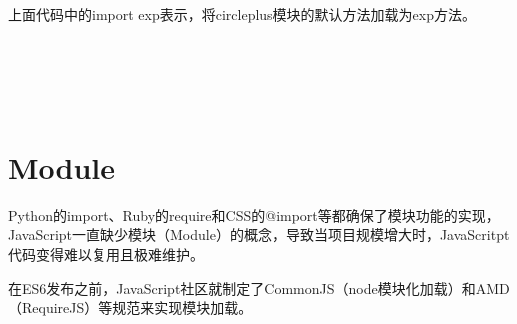 上面代码中的import exp表示，将circleplus模块的默认方法加载为exp方法。




\begin{lstlisting}[language=JavaScript]

\end{lstlisting}






\begin{lstlisting}[language=JavaScript]

\end{lstlisting}







\begin{lstlisting}[language=JavaScript]

\end{lstlisting}







\begin{lstlisting}[language=JavaScript]

\end{lstlisting}







\begin{lstlisting}[language=JavaScript]

\end{lstlisting}






\begin{lstlisting}[language=JavaScript]

\end{lstlisting}


\chapter{Module}

Python的import、Ruby的require和CSS的@import等都确保了模块功能的实现，JavaScript一直缺少模块（Module）的概念，导致当项目规模增大时，JavaScritpt代码变得难以复用且极难维护。




在ES6发布之前，JavaScript社区就制定了CommonJS（node模块化加载）和AMD（RequireJS）等规范来实现模块加载。

